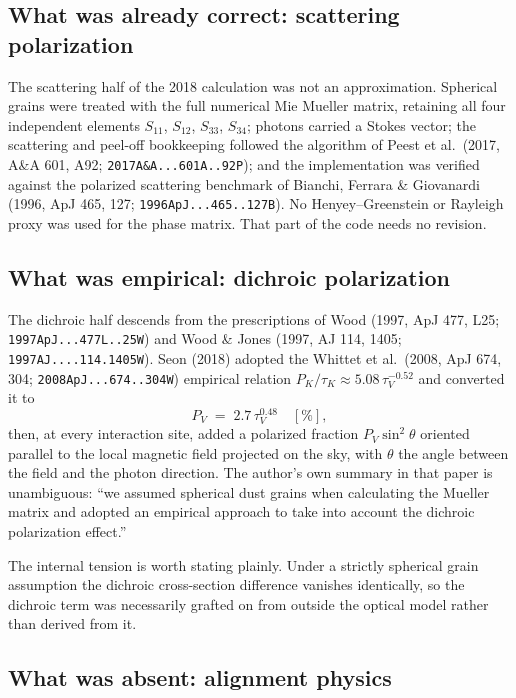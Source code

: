 \documentclass{my_memo}
\newcommand{\code}[1]{\texttt{#1}}
\begin{document}
\subsection{What was already correct: scattering polarization}

The scattering half of the 2018 calculation was not an approximation.
Spherical grains were treated with the full numerical Mie Mueller matrix,
retaining all four independent elements $S_{11}$, $S_{12}$, $S_{33}$,
$S_{34}$; photons carried a Stokes vector; the scattering and peel-off
bookkeeping followed the algorithm of Peest et al.\ (2017, A\&A 601,
A92; \code{2017A\&A...601A..92P}); and the implementation was verified
against the polarized scattering benchmark of Bianchi, Ferrara \& Giovanardi
(1996, ApJ 465, 127; \code{1996ApJ...465..127B}). No Henyey--Greenstein
or Rayleigh proxy was used for the phase matrix. That part of the code
needs no revision.

\subsection{What was empirical: dichroic polarization}

The dichroic half descends from the prescriptions of Wood (1997, ApJ 477,
L25; \code{1997ApJ...477L..25W}) and Wood \& Jones (1997, AJ 114, 1405;
\code{1997AJ....114.1405W}). Seon (2018) adopted the Whittet et al.\
(2008, ApJ 674, 304; \code{2008ApJ...674..304W}) empirical relation
$P_K/\tau_K \approx 5.08\,\tau_V^{-0.52}$ and converted it to
\begin{equation}
  P_V \;=\; 2.7\,\tau_V^{0.48} \quad [\%],
  \label{eq:whittet}
\end{equation}
then, at every interaction site, added a polarized fraction
$P_V\sin^2\theta$ oriented parallel to the local magnetic field
projected on the sky, with $\theta$ the angle between the field and the
photon direction. The author's own summary in that paper is unambiguous:
``we assumed spherical dust grains when calculating the Mueller matrix
and adopted an empirical approach to take into account the dichroic
polarization effect.''

The internal tension is worth stating plainly. Under a strictly spherical
grain assumption the dichroic cross-section difference vanishes
identically, so the dichroic term was necessarily grafted on from
outside the optical model rather than derived from it.

\subsection{What was absent: alignment physics}
\end{document}
